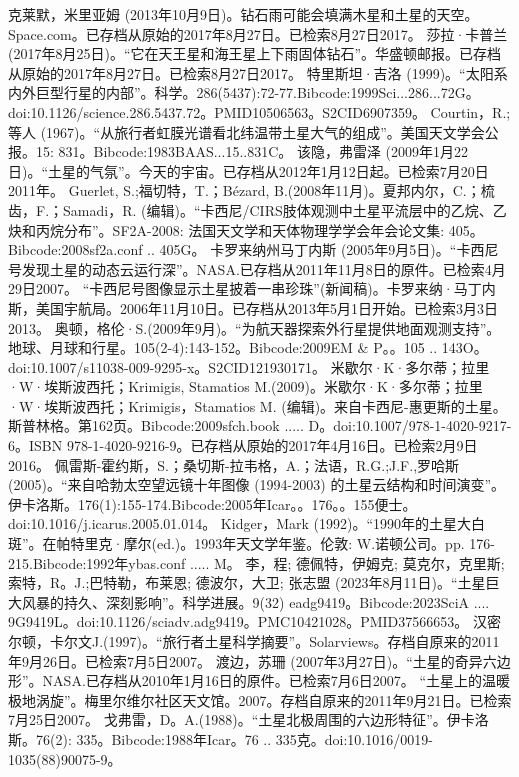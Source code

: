 \begin{enumerate}
 克莱默，米里亚姆 (2013年10月9日)。钻石雨可能会填满木星和土星的天空。Space.com。已存档从原始的2017年8月27日。已检索8月27日2017。
 莎拉·卡普兰 (2017年8月25日)。“它在天王星和海王星上下雨固体钻石”。华盛顿邮报。已存档从原始的2017年8月27日。已检索8月27日2017。
 特里斯坦·吉洛 (1999)。“太阳系内外巨型行星的内部”。科学。286(5437):72-77.Bibcode:1999Sci...286...72G。doi:10.1126/science.286.5437.72。PMID10506563。S2CID6907359。  
 Courtin，R.; 等人 (1967)。“从旅行者虹膜光谱看北纬温带土星大气的组成”。美国天文学会公报。15: 831。Bibcode:1983BAAS...15..831C。
 该隐，弗雷泽 (2009年1月22日)。“土星的气氛”。今天的宇宙。已存档从2012年1月12日起。已检索7月20日2011年。
 Guerlet, S.;福切特，T.；Bézard, B.(2008年11月)。夏邦内尔，C.；梳齿，F.；Samadi，R. (编辑)。“卡西尼/CIRS肢体观测中土星平流层中的乙烷、乙炔和丙烷分布”。SF2A-2008: 法国天文学和天体物理学学会年会论文集: 405。Bibcode:2008sf2a.conf .. 405G。
 卡罗来纳州马丁内斯 (2005年9月5日)。“卡西尼号发现土星的动态云运行深”。NASA.已存档从2011年11月8日的原件。已检索4月29日2007。
 “卡西尼号图像显示土星披着一串珍珠”(新闻稿)。卡罗来纳·马丁内斯，美国宇航局。2006年11月10日。已存档从2013年5月1日开始。已检索3月3日2013。
 奥顿，格伦·S.(2009年9月)。“为航天器探索外行星提供地面观测支持”。地球、月球和行星。105(2-4):143-152。Bibcode:2009EM & P。。105 .. 143O。doi:10.1007/s11038-009-9295-x。S2CID121930171。 
 米歇尔·K·多尔蒂；拉里·W·埃斯波西托；Krimigis, Stamatios M.(2009)。米歇尔·K·多尔蒂；拉里·W·埃斯波西托；Krimigis，Stamatios M. (编辑)。来自卡西尼-惠更斯的土星。斯普林格。第162页。Bibcode:2009sfch.book ..... D。doi:10.1007/978-1-4020-9217-6。ISBN 978-1-4020-9216-9。已存档从原始的2017年4月16日。已检索2月9日2016。
 佩雷斯-霍约斯，S.；桑切斯-拉韦格，A.；法语，R.G.;J.F.,罗哈斯 (2005)。“来自哈勃太空望远镜十年图像 (1994-2003) 的土星云结构和时间演变”。伊卡洛斯。176(1):155-174.Bibcode:2005年Icar。。176。。155便士。doi:10.1016/j.icarus.2005.01.014。
 Kidger，Mark (1992)。“1990年的土星大白斑”。在帕特里克·摩尔(ed.)。1993年天文学年鉴。伦敦: W.诺顿公司。pp. 176-215.Bibcode:1992年ybas.conf ..... M。
 李，程; 德佩特，伊姆克; 莫克尔，克里斯; 索特，R。J.;巴特勒，布莱恩; 德波尔，大卫; 张志盟 (2023年8月11日)。“土星巨大风暴的持久、深刻影响”。科学进展。9(32) eadg9419。Bibcode:2023SciA .... 9G9419L。doi:10.1126/sciadv.adg9419。PMC10421028。PMID37566653。  
 汉密尔顿，卡尔文J.(1997)。“旅行者土星科学摘要”。Solarviews。存档自原来的2011年9月26日。已检索7月5日2007。
 渡边，苏珊 (2007年3月27日)。“土星的奇异六边形”。NASA.已存档从2010年1月16日的原件。已检索7月6日2007。
 “土星上的温暖极地涡旋”。梅里尔维尔社区天文馆。2007。存档自原来的2011年9月21日。已检索7月25日2007。
 戈弗雷，D。A.(1988)。“土星北极周围的六边形特征”。伊卡洛斯。76(2): 335。Bibcode:1988年Icar。76 .. 335克。doi:10.1016/0019-1035(88)90075-9。

\end{enumerate}
